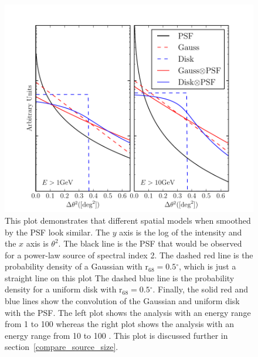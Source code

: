 \documentclass[12pt,preprint]{aastex}
\newcommand{\gev}{\text{GeV}\xspace}
\newcommand{\rsixeight}{{\ensuremath{\text{r}_{68}}}\xspace}
\renewcommand{\deg}{\ensuremath{^\circ}\xspace}
\begin{document}
\begin{figure}
  \begin{center}
    \includegraphics{mc_plots/compare_disk_gauss.pdf}
    \end{center}
    \caption{
    This plot demonstrates that different spatial models when smoothed
    by the PSF look similar.  The $y$ axis is the log of the
    intensity and the $x$ axis is $\theta^2$.  The black line is the
    PSF that would be observed for a power-law source of spectral index
    2. The dashed red line is the probability density of a Gaussian with
    $\rsixeight=0.5\deg$, which is just a straight line on this plot
    The dashed blue line is the probability density for a uniform disk
    with $\rsixeight=0.5\deg$.  Finally, the solid red and blue lines
    show the convolution of the Gaussian and uniform disk with the PSF.
    The left plot shows the analysis with an energy range from 1 \gev to
    100 \gev whereas the right plot shows the analysis with an energy
    range from 10 \gev to 100 \gev.  This plot is discussed further in
    section~\ref{compare_source_size}.
    }\label{compare_disk_gauss}
  \end{figure}
\end{document}
